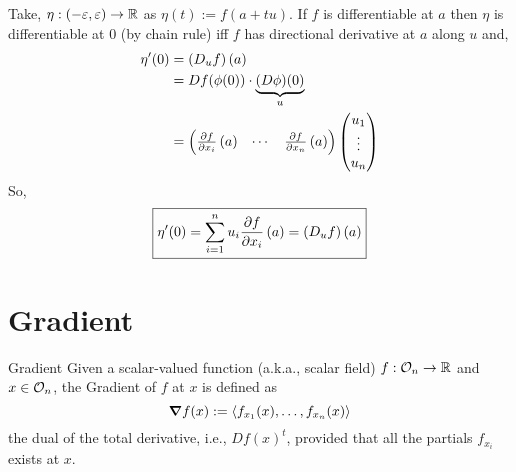 \documentclass[../Analysis-3.tex]{subfiles}
\begin{document}
Take, $ \eta : \left( -\varepsilon, \varepsilon \right) \to \mathbb{R} $ as $ \eta(t) := f(a+tu) $. If $ f $ is differentiable at $ a $ then $ \eta $ is differentiable at 0 (by chain rule) iff $f$ has directional derivative at $ a $ along $ u $ and,
\begin{align*}
  \eta'(0)
   & = \left( D_uf \right)\left( a \right)                                  \\
   & = Df(\phi(0))\cdot \underbrace{(D\phi)(0)}_{u}                         \\
   & = \begin{pmatrix}
         \pdv{f}{x_i}\left( a \right) & \cdots & \pdv{f}{x_n}\left( a \right)
       \end{pmatrix}\begin{pmatrix}
                      u_1 \\ \vdots \\ u_n \end{pmatrix}
\end{align*}
So,
\[
  \boxed{\eta'(0) = \sum_{i=1}^{n}u_i\pdv{f}{x_i} \left( a \right) = \left( D_uf \right)\left( a \right)}
\]


\section{Gradient}

\begin{Def}{Gradient}{}
  Given a scalar-valued function (a.k.a., scalar field) $ f:\mathcal{O}_{n}\to\mathbb{R} $ and $ x\in\mathcal{O}_{n} $, the Gradient of $ f $ at $ x $ is defined as
  \[
    \grad f(x) := \left\langle f_{x_1}(x), \ldots, f_{x_n}(x) \right\rangle
  \]
  the dual of the total derivative, i.e., $ Df(x)^t $, provided that all the partials $ f_{x_i} $ exists at $ x $.
\end{Def}
\end{document}
